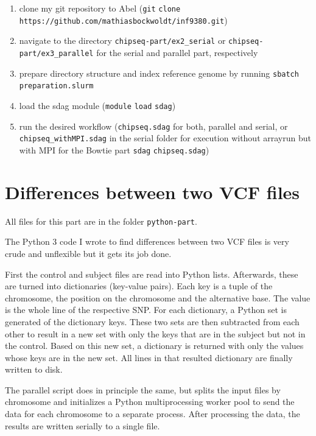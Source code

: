 \documentclass[paper=a4, 12pt]{scrartcl}
\begin{document}
\begin{flushleft}
\begin{enumerate}
\item clone my git repository to Abel (\texttt{git} \texttt{clone} \texttt{https://}\allowbreak\texttt{github.com/}\allowbreak\texttt{mathiasbockwoldt/}\allowbreak\texttt{inf9380.git})
\item navigate to the directory \texttt{chipseq-part/}\allowbreak\texttt{ex2\_serial} or \texttt{chipseq-part/}\allowbreak\texttt{ex3\_parallel} for the serial and parallel part, respectively
\item prepare directory structure and index reference genome by running \texttt{sbatch} \texttt{preparation.slurm}
\item load the sdag module (\texttt{module} \texttt{load} \texttt{sdag})
\item run the desired workflow (\texttt{chipseq.sdag} for both, parallel and serial, or \texttt{chipseq\_withMPI.sdag} in the serial folder for execution without arrayrun but with MPI for the Bowtie part \texttt{sdag} \texttt{chipseq.sdag})
\end{enumerate}
\end{flushleft}


\section{Differences between two VCF files}

All files for this part are in the folder \texttt{python-part}.

The Python 3 code I wrote to find differences between two VCF files is very crude and unflexible but it gets its job done.

First the control and subject files are read into Python lists. Afterwards, these are turned into dictionaries (key-value pairs). Each key is a tuple of the chromosome, the position on the chromosome and the alternative base. The value is the whole line of the respective SNP. For each dictionary, a Python set is generated of the dictionary keys. These two sets are then subtracted from each other to result in a new set with only the keys that are in the subject but not in the control. Based on this new set, a dictionary is returned with only the values whose keys are in the new set. All lines in that resulted dictionary are finally written to disk.

The parallel script does in principle the same, but splits the input files by chromosome and initializes a Python multiprocessing worker pool to send the data for each chromosome to a separate process. After processing the data, the results are written serially to a single file.
\end{document}

